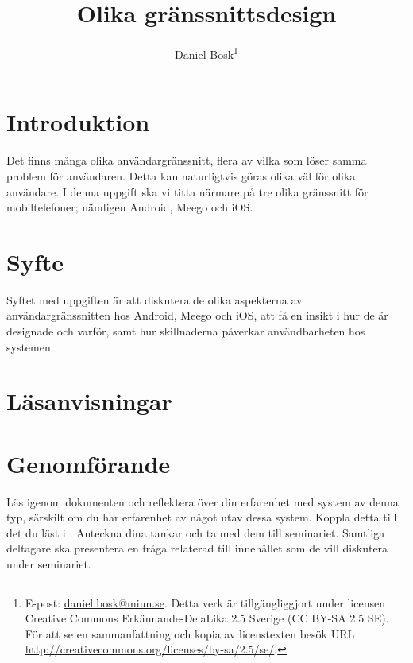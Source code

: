 \documentclass[a4paper,logo,nocourse]{miunasgn}
\title{Olika gränssnittsdesign}
\author{Daniel Bosk\footnote{%
	E-post: \href{mailto:daniel.bosk@miun.se}{daniel.bosk@miun.se}.
  Detta verk är tillgängliggjort under licensen Creative Commons 
  Erkännande-DelaLika 2.5 Sverige (CC BY-SA 2.5 SE).
	För att se en sammanfattning och kopia av licenstexten besök URL 
	\url{http://creativecommons.org/licenses/by-sa/2.5/se/}.
}}
\date{\svnId}
\begin{document}
\maketitle
\thispagestyle{foot}
\tableofcontents


\section{Introduktion}
\label{sec:Introduktion}
Det finns många olika användargränssnitt, flera av vilka som löser samma 
problem för användaren.
Detta kan naturligtvis göras olika väl för olika användare.
I denna uppgift ska vi titta närmare på tre olika gränssnitt för 
mobiltelefoner; nämligen Android, Meego och iOS.


\section{Syfte}
\label{sec:Syfte}
Syftet med uppgiften är att diskutera de olika aspekterna av 
användargränssnitten hos Android, Meego och iOS, att få en insikt i hur de är 
designade och varför, samt hur skillnaderna påverkar användbarheten hos 
systemen.


\section{Läsanvisningar}
\label{sec:Lasanvisningar}



\section{Genomförande}
\label{sec:Genomforande}
Läs igenom dokumenten och reflektera över din erfarenhet med system av denna 
typ, särskilt om du har erfarenhet av något utav dessa system.
Koppla detta till det du läst i  \citep{Sharp2011idb}.
Anteckna dina tankar och ta med dem till seminariet.
Samtliga deltagare ska presentera en fråga relaterad till innehållet som de 
vill diskutera under seminariet.
\end{document}
